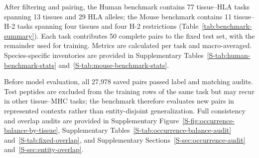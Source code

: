 After filtering and pairing, the Human benchmark contains 77 tissue--HLA tasks spanning 13 tissues and 29 HLA alleles; the Mouse benchmark contains 11 tissue--H-2 tasks spanning four tissues and four H-2 restrictions (Table~\ref{tab:benchmark-summary}). Each task contributes 50 complete pairs to the fixed test set, with the remainder used for training. Metrics are calculated per task and macro-averaged. Species-specific inventories are provided in Supplementary Tables~\ref{S-tab:human-benchmark-stats} and~\ref{S-tab:mouse-benchmark-stats}.

Before model evaluation, all 27,978 saved pairs passed label and matching audits. Test peptides are excluded from the training rows of the same task but may recur in other tissue--MHC tasks; the benchmark therefore evaluates new pairs in represented contexts rather than entity-disjoint generalization. Full consistency and overlap audits are provided in Supplementary Figure~\ref{S-fig:occurrence-balance-by-tissue}, Supplementary Tables~\ref{S-tab:occurrence-balance-audit} and~\ref{S-tab:fixed-overlap}, and Supplementary Sections~\ref{S-sec:occurrence-audit} and~\ref{S-sec:entity-overlap}.